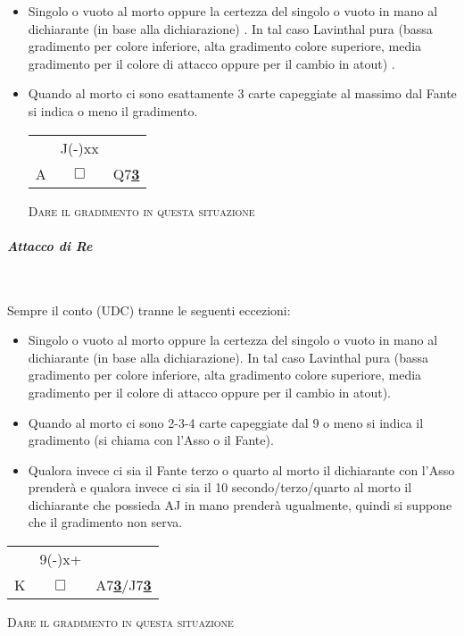 \documentclass[a4paper,italian]{article}
\newcommand{\cards}[1]{\textrm{#1}}
\newcommand\onesuitenw[3]%
{%
    \begin{center}%
        \begin{tabular}{>{\hfill}p{3cm}cp{3cm}}%
                & \cards{#2} \\%
            \cards{#1}& $\Box$    & \cards{#3}%
        \end{tabular}%
    \end{center}%
}
\begin{document}
\begin{itemize}
    \item Singolo o vuoto al morto oppure la certezza del singolo o vuoto in mano al dichiarante
        (in base alla dichiarazione) . In tal caso Lavinthal pura (bassa gradimento per colore
        inferiore, alta gradimento colore superiore, media gradimento per il colore di attacco
        oppure per il cambio in atout) .
    \item Quando al morto ci sono esattamente 3 carte capeggiate al massimo dal Fante si indica
        o meno il gradimento.

        \onesuitenw{A}{J(-)xx}{Q7\underline{\textbf{3}}}
        \begin{center}
            \textsc{Dare il gradimento in questa situazione}
        \end{center}
\end{itemize}

\paragraph{\textit{Attacco di Re}}\mbox{}\\
\vspace{-.4cm}

Sempre il conto (UDC) tranne le seguenti eccezioni:
\begin{itemize}
    \item Singolo o vuoto al morto oppure la certezza del singolo o vuoto in mano al dichiarante
        (in base alla dichiarazione). In tal caso Lavinthal pura (bassa gradimento per colore
        inferiore, alta gradimento colore superiore, media gradimento per il colore di attacco
        oppure per il cambio in atout).
    \item Quando al morto ci sono 2-3-4 carte capeggiate dal 9 o meno si indica il gradimento (si
        chiama con l’Asso o il Fante).
    \item Qualora invece ci sia il Fante terzo o quarto al morto il
        dichiarante con l’Asso prenderà e qualora invece ci sia il 10 secondo/terzo/quarto al
        morto il dichiarante che possieda AJ in mano prenderà ugualmente, quindi si suppone
        che il gradimento non serva.
\end{itemize}
\gamefont{\rmfamily\normalsize}
\onesuitenw{K}{9(-)x+}{A7\underline{\textbf{3}}/J7\underline{\textbf{3}}}
\begin{center}
    \textsc{Dare il gradimento in questa situazione}
\end{center}
\end{document}
